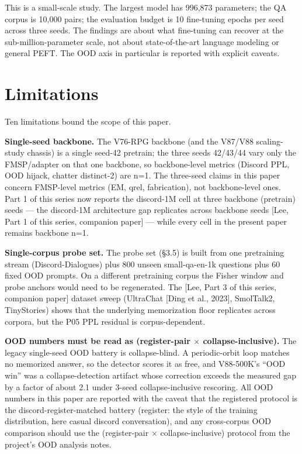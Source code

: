 \documentclass[11pt]{article}
\begin{document}
This is a small-scale study. The largest model has 996{,}873 parameters; the QA corpus is 10{,}000 pairs; the evaluation budget is 10 fine-tuning epochs per seed across three seeds. The findings are about what fine-tuning can recover at the sub-million-parameter scale, not about state-of-the-art language modeling or general PEFT. The OOD axis in particular is reported with explicit caveats.

\section{Limitations}

Ten limitations bound the scope of this paper.

\textbf{Single-seed backbone.} The V76-RPG backbone (and the V87/V88 scaling-study chassis) is a single seed-42 pretrain; the three seeds 42/43/44 vary only the FMSP/adapter on that one backbone, so backbone-level metrics (Discord PPL, OOD hijack, chatter distinct-2) are n=1. The three-seed claims in this paper concern FMSP-level metrics (EM, qrel, fabrication), not backbone-level ones. Part 1 of this series now reports the discord-1M cell at three backbone (pretrain) seeds --- the discord-1M architecture gap replicates across backbone seeds [Lee, Part 1 of this series, companion paper] --- while every cell in the present paper remains backbone n=1.

\textbf{Single-corpus probe set.} The probe set (\S3.5) is built from one pretraining stream (Discord-Dialogues) plus 800 unseen small-qa-en-1k questions plus 60 fixed OOD prompts. On a different pretraining corpus the Fisher window and probe anchors would need to be regenerated. The [Lee, Part 3 of this series, companion paper] dataset sweep (UltraChat [Ding et al., 2023], SmolTalk2, TinyStories) shows that the underlying memorization floor replicates across corpora, but the P05 PPL residual is corpus-dependent.

\textbf{OOD numbers must be read as (register-pair $\times$ collapse-inclusive).} The legacy single-seed OOD battery is collapse-blind. A periodic-orbit loop matches no memorized answer, so the detector scores it as free, and V88-500K's ``OOD win'' was a collapse-detection artifact whose correction exceeds the measured gap by a factor of about 2.1 under 3-seed collapse-inclusive rescoring. All OOD numbers in this paper are reported with the caveat that the registered protocol is the discord-register-matched battery (register: the style of the training distribution, here casual discord conversation), and any cross-corpus OOD comparison should use the (register-pair $\times$ collapse-inclusive) protocol from the project's OOD analysis notes.
\end{document}
